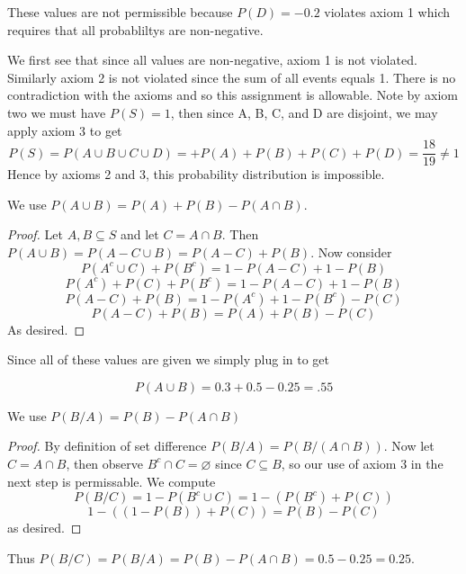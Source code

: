 \documentclass[11pt,largemargins]{homework}
\begin{document}
\maketitle

\question
\begin{alphaparts}
    \questionpart
    These values are not permissible because $P(D) = -0.2$ violates axiom 1 which requires that all probabliltys are non-negative. 

    \questionpart 
    We first see that since all values are non-negative, axiom 1 is not violated. Similarly axiom 2 is not violated since the sum 
    of all events equals 1. There is no contradiction with the axioms and so this assignment is allowable.
    \questionpart
    Note by axiom two we must have $P(S) = 1$, then since A, B, C, and D are disjoint, we may apply axiom 3 to get 
    \[ P(S) = P(A \cup B \cup C \cup D) = + P(A) + P(B) + P(C) + P(D) = \frac{18}{19} \neq 1 \] 
    Hence by axioms 2 and 3, this probability distribution is impossible. 
\end{alphaparts}

\question 
\begin{alphaparts}
    \questionpart
    We use $P(A \cup B) = P(A) + P(B) - P(A \cap B)$. 
    
    \begin{proof}
    Let $A, B \subseteq S$ and let $C = A \cap B$. Then $P(A \cup B) = P(A - C \cup B) = P(A  - C) + P(B)$.
    Now consider 
    \[P(A^c \cup C) + P(B^c) = 1 - P(A - C)  + 1 - P(B)\]
    \[P(A^c) + P(C) + P(B^c) = 1 - P(A - C) + 1 - P(B)\]
    \[P(A - C) + P(B) = 1 - P(A^c) + 1 - P(B^c) - P(C)\]
    \[P(A - C) + P(B) = P(A) + P(B) - P(C) \] 
    As desired. 
    \end{proof}
    
    
    Since all of these values are given we simply plug in to get 

    \[ P(A \cup B) = 0.3 + 0.5 - 0.25 = .55 \] 

    \questionpart
    We use $P(B/A) = P(B) - P(A \cap B)$

    \begin{proof}

    By definition of set difference 
    $P(B/A) = P(B/( A \cap B))$. Now let $C = A \cap B$, then observe $B^c \cap C = \varnothing$ 
    since $C \subseteq B$, so our use of axiom 3 in the next step is permissable. We compute 
    \[ P(B/C) = 1 - P(B^c \cup C) = 1 - (P(B^c) + P(C)) \] 
    \[ 1 - ((1 - P(B)) + P(C)) = P(B) - P(C)\]
    as desired.
    \end{proof}
    Thus $P(B/C) = P(B/A) = P(B) - P(A \cap B) = 0.5 - 0.25 = 0.25$.

\end{alphaparts}
\end{document}
